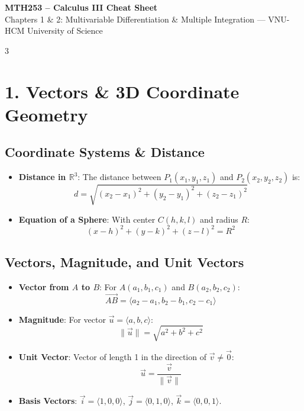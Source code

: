\documentclass[10pt,landscape,a4paper]{article}
\begin{document}
\footnotesize

\begin{center}
    \textbf{\large MTH253 -- Calculus III Cheat Sheet} \\
    \scriptsize Chapters 1 \& 2: Multivariable Differentiation \& Multiple Integration --- VNU-HCM University of Science
\end{center}

\begin{multicols*}{3}

\section{1. Vectors \& 3D Coordinate Geometry}
\subsection{Coordinate Systems \& Distance}
\begin{itemize}
    \item \textbf{Distance in $\mathbb{R}^3$}: The distance between $P_1(x_1, y_1, z_1)$ and $P_2(x_2, y_2, z_2)$ is:
    \[ d = \sqrt{(x_2-x_1)^2 + (y_2-y_1)^2 + (z_2-z_1)^2} \]
    \item \textbf{Equation of a Sphere}: With center $C(h,k,l)$ and radius $R$:
    \[ (x-h)^2 + (y-k)^2 + (z-l)^2 = R^2 \]
\end{itemize}

\subsection{Vectors, Magnitude, and Unit Vectors}
\begin{itemize}
    \item \textbf{Vector from $A$ to $B$}: For $A(a_1, b_1, c_1)$ and $B(a_2, b_2, c_2)$:
    \[ \vec{AB} = \langle a_2 - a_1, b_2 - b_1, c_2 - c_1 \rangle \]
    \item \textbf{Magnitude}: For vector $\vec{u} = \langle a, b, c \rangle$:
    \[ \|\vec{u}\| = \sqrt{a^2 + b^2 + c^2} \]
    \item \textbf{Unit Vector}: Vector of length 1 in the direction of $\vec{v} \neq \vec{0}$:
    \[ \vec{u} = \frac{\vec{v}}{\|\vec{v}\|} \]
    \item \textbf{Basis Vectors}: $\vec{i} = \langle 1,0,0 \rangle$, $\vec{j} = \langle 0,1,0 \rangle$, $\vec{k} = \langle 0,0,1 \rangle$.
\end{itemize}


\end{multicols*}
\end{document}

